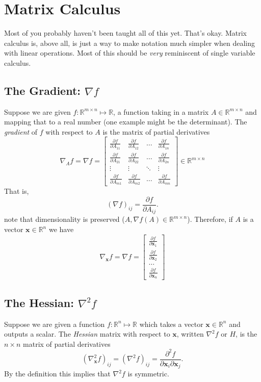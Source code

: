 \documentclass{article}
\newcommand{\1}{\mathbf{1}}
\newcommand{\0}{\mathbf{0}}
\newcommand{\xx}{\mathbf{x}}
\newcommand{\RR}{\mathbb{R}}
\newcommand{\m}[1]{\begin{bmatrix} #1 \end{bmatrix}}
\begin{document}
\section{Matrix Calculus}

Most of you probably haven't been taught all of this yet. That's okay. Matrix calculus
is, above all, is just a way to make notation much simpler when dealing with
linear operations. Most of this should be \textit{very}
reminiscent of single variable calculus.

\subsection{The Gradient: $\nabla f$}

Suppose we are given $f : \RR^{m\times n} \mapsto \RR$, a function taking in a matrix
$A\in\RR^{m\times n}$ and mapping that to a real number (one example might be the determinant).
The \textit{gradient} of $f$ with respect to $A$ is the matrix of partial derivatives
\[
    \nabla_A f = \nabla f = \m{\frac{\partial f}{\partial A_{11}} & \frac{\partial f}{\partial A_{12}} & \dots & \frac{\partial f}{\partial A_{1n}}\\
    \frac{\partial f}{\partial A_{21}} & \frac{\partial f}{\partial A_{22}} & \dots & \frac{\partial f}{\partial A_{2n}}\\
    \vdots & \vdots & \ddots & \vdots\\
    \frac{\partial f}{\partial A_{m1}} & \frac{\partial f}{\partial A_{m2}} & \dots & \frac{\partial f}{\partial A_{mn}}
    } \in \RR^{m\times n}
\]
That is,
\[
    (\nabla f)_{ij} = \frac{\partial f}{\partial A_{ij}}.
\]
note that dimensionality is preserved ($A,\nabla f(A) \in \RR^{m\times n}$). Therefore,
if $A$ is a vector $\xx\in\RR^n$ we have
\[
    \nabla_\xx f = \nabla f = \m{\frac{\partial f}{\partial \xx_1} \\ \frac{\partial f}{\partial \xx_2} \\ \dots \\ \frac{\partial f}{\partial \xx_n}}
\]

\subsection{The Hessian: $\nabla^2f$}

Suppose we are given a function $f : \RR^n \mapsto \RR$ which takes a vector $\xx\in\RR^n$
and outputs a scalar. The \textit{Hessian} matrix with respect to $\xx$, written $\nabla^2 f$
or $H$, is the $n\times n$ matrix of partial derivatives
\[
    \left(\nabla_\xx^2 f\right)_{ij} = \left( \nabla^2f \right)_{ij} = \frac{\partial^2 f}{\partial \xx_i \partial \xx_j}.
\]
By the definition this implies that $\nabla^2 f$ is symmetric.\\
\end{document}
